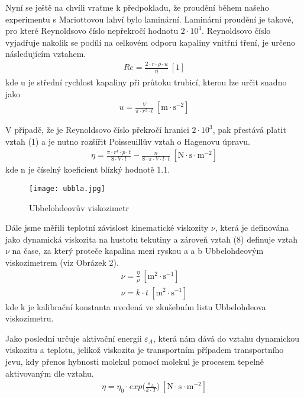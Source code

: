 \documentclass{article}
\begin{document}
\par Nyní se ještě na chvíli vraťme k předpokladu, že proudění během našeho experimentu s Mariottovou lahví bylo laminární. Laminární proudění je takové, pro které Reynoldsovo číslo nepřekročí hodnotu $2\cdot 10^{3}$. Reynoldsovo číslo vyjadřuje nakolik se podílí na celkovém odporu kapaliny vnitřní tření, je určeno následujícím vztahem.
\begin{align}
Re = \frac{2\cdot r\cdot \rho  \cdot u}{\eta} \:  \mathrm{[1]}
\end{align}
kde u je střední rychlost kapaliny při průtoku trubicí, kterou lze určit snadno jako
\begin{align}
u = \frac{V}{\pi \cdot r^{2} \cdot t} \:  \mathrm{[m\cdot s^{-2}]}
\end{align}
\par V případě, že je Reynoldsovo číslo překročí hranici $2\cdot 10^{3}$, pak přestává platit vztah (1) a je nutno rozšířit Poisseuillův vztah o Hagenovu úpravu.
\begin{align}
\eta = \frac{\pi \cdot r^{4}  \cdot p \cdot t}{8\cdot V \cdot l} - \frac{n}{8\cdot \pi \cdot V \cdot l \cdot t}\:  \mathrm{[N \cdot s \cdot m^{-2}]}
\end{align}
kde n je číselný koeficient blízký hodnotě 1.1.
\begin{figure}[H]
\centering
\caption{Ubbelohdeovův viskozimetr}
\texttt{[image: ubbla.jpg]}
\end{figure}
\par Dále jsme měřili teplotní závislost kinematické viskozity $\nu$, která je definována jako dynamická viskozita na hustotu tekutiny a zároveň vztah (8) definuje vztah $\nu$ na čase, za který proteče kapalina mezi ryskou a a b Ubbelohdeovým viskozimetrem (viz Obrázek 2).
\begin{align}
\nu = \frac{\eta}{\rho}\:  \mathrm{[m^{2} \cdot s^{-1}]} \\
\nu = k\cdot t\:  \mathrm{[m^{2} \cdot s^{-1}]}
\end{align}
kde k je kalibrační konstanta uvedená ve zkušebním listu Ubbelohdeova viskozimetru.
\par Jako poslední určuje aktivační energii $\varepsilon_{A}$, která nám dává do vztahu dynamickou viskozitu a teplotu, jelikož viskozita je transportním případem transportního jevu, kdy přenos hybnosti molekul pomocí molekul je procesem tepelně aktivovaným dle vztahu.
\begin{align}
\eta = \eta_{0} \cdot exp\Bigg(\frac{\varepsilon_{A}}{k \cdot T} \Bigg) \:  \mathrm{[N \cdot s \cdot m^{-2}]}
\end{align}
\end{document}
